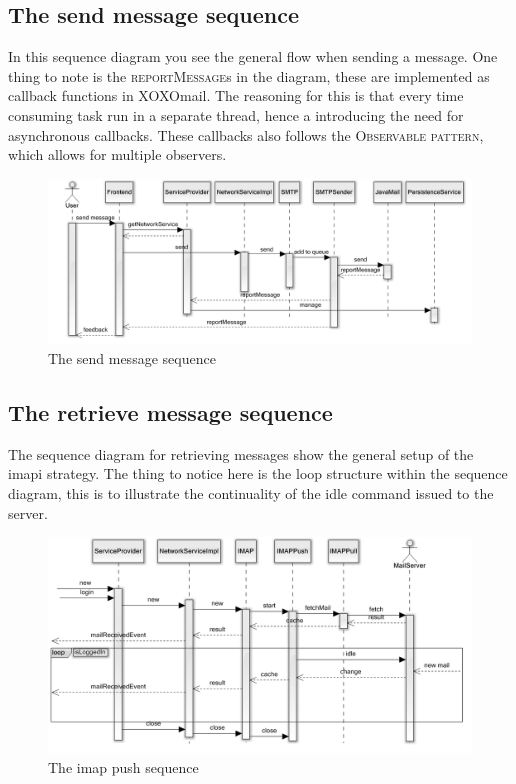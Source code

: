 \subsection{The send message sequence}
	In this sequence diagram you see the general flow when sending a message. One thing to note is the \textsc{reportMessage}s in the diagram, these are implemented as callback functions in XOXOmail. The reasoning for this is that every time consuming task run in a separate thread, hence a introducing the need for asynchronous callbacks. These callbacks also follows the \textsc{Observable pattern}\cite{bib:observer}, which allows for multiple observers. 
	\begin{figure}[H]
		\includegraphics[width=\textwidth]{SendSequence}
		\caption{The send message sequence}
		\label{fig:lifecycle}
	\end{figure}
\subsection{The retrieve message sequence}
	The sequence diagram for retrieving messages show the general setup of the \gls{imapi} strategy. The thing to notice here is the loop structure within the sequence diagram, this is to illustrate the continuality of the idle command issued to the server. 
	\begin{figure}[H]
		\includegraphics[width=\textwidth]{IMAPPushSequence}
		\caption{The imap push sequence}
		\label{fig:lifecycle}
	\end{figure}
	
